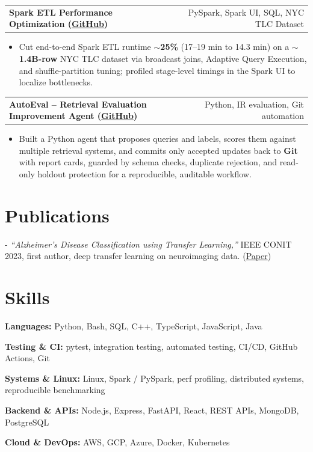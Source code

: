 \documentclass[letterpaper,11pt]{article}
\makeatletter
\newcommand{\projItem}[2]{%
  \vspace{2pt}
  \begin{tabular*}{\textwidth}{@{}l@{\extracolsep{\fill}}r@{}}
    \textbf{#1} & #2 \\
  \end{tabular*}\par\vspace{-3pt}
}
\newcommand{\skillLine}[2]{\textbf{#1:} #2\par\vspace{1.5pt}}
\newcommand{\inlineBlock}[1]{{\setlength{\leftskip}{0.18in}\small #1\par}}
\makeatother
\begin{document}
\projItem{Spark ETL Performance Optimization {\normalfont\small(\href{https://github.com/Deva-1903/Spark-ETL-Optimization}{GitHub})}}{PySpark, Spark UI, SQL, NYC TLC Dataset}
\begin{itemize}
  \item Cut end-to-end Spark ETL runtime \textbf{$\sim$25\%} (17--19 min to 14.3 min) on a \textbf{$\sim$1.4B-row} NYC TLC dataset via broadcast joins, Adaptive Query Execution, and shuffle-partition tuning; profiled stage-level timings in the Spark UI to localize bottlenecks.
\end{itemize}

\projItem{AutoEval -- Retrieval Evaluation Improvement Agent {\normalfont\small(\href{https://github.com/Deva-1903/AutoEval}{GitHub})}}{Python, IR evaluation, Git automation}
\begin{itemize}
  \item Built a Python agent that proposes queries and labels, scores them against multiple retrieval systems, and commits only accepted updates back to \textbf{Git} with report cards, guarded by schema checks, duplicate rejection, and read-only holdout protection for a reproducible, auditable workflow.
\end{itemize}

\section{Publications}
\vspace{2pt}
\inlineBlock{- \textit{``Alzheimer's Disease Classification using Transfer Learning,''} IEEE CONIT 2023, first author, deep transfer learning on neuroimaging data. {\normalfont\small(\href{https://ieeexplore.ieee.org/document/10205760}{Paper})}}

\section{Skills}
\skillLine{Languages}{Python, Bash, SQL, C++, TypeScript, JavaScript, Java}
\skillLine{Testing \& CI}{pytest, integration testing, automated testing, CI/CD, GitHub Actions, Git}
\skillLine{Systems \& Linux}{Linux, Spark / PySpark, perf profiling, distributed systems, reproducible benchmarking}
\skillLine{Backend \& APIs}{Node.js, Express, FastAPI, React, REST APIs, MongoDB, PostgreSQL}
\skillLine{Cloud \& DevOps}{AWS, GCP, Azure, Docker, Kubernetes}
\end{document}
